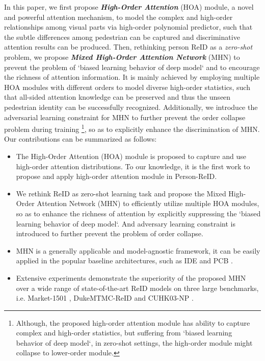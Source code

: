 \documentclass[10pt,twocolumn,letterpaper]{article}
\begin{document}
In this paper, we first propose \emph{\textbf{High-Order Attention}} (HOA) module, a novel and powerful attention mechanism, to model the complex and high-order relationships among visual parts via high-order polynomial predictor, such that the subtle differences among pedestrian can be captured and discriminative attention results can be produced. Then, rethinking person ReID as a \emph{zero-shot} problem, we propose \emph{\textbf{Mixed High-Order Attention Network}} (MHN) to prevent the problem of `biased learning behavior of deep model` \cite{chen2019energy} and to encourage the richness of attention information. It is mainly achieved by employing multiple HOA modules with different orders to model diverse high-order statistics, such that all-sided attention knowledge can be preserved and thus the unseen pedestrian identity can be successfully recognized. Additionally, we introduce the adversarial learning constraint for MHN to further prevent the order collapse problem during training \footnote{Although, the proposed high-order attention module has ability to capture complex and high-order statistics, but suffering from `biased learning behavior of deep model`, in zero-shot settings, the high-order module might collapse to lower-order module.}, so as to explicitly enhance the discrimination of MHN. Our contributions can be summarized as follows:
\begin{itemize}
\vspace{-0.5em}
  \item The High-Order Attention (HOA) module is proposed to capture and use high-order attention distributions. To our knowledge, it is the first work to propose and apply high-order attention module in Person-ReID.
      \vspace{-0.5em}
  \item We rethink ReID as zero-shot learning task and propose the Mixed High-Order Attention Network (MHN) to efficiently utilize multiple HOA modules, so as to enhance the richness of attention by explicitly suppressing the `biased learning behavior of deep model`. And adversary learning constraint is introduced to further prevent the problem of order collapse.
      \vspace{-0.5em}
  \item MHN is a generally applicable and model-agnostic framework, it can be easily applied in the popular baseline architectures, such as IDE \cite{zheng2016person} and PCB \cite{sun2018beyond}.
      \vspace{-0.5em}
  \item Extensive experiments demonstrate the superiority of the proposed MHN over a wide range of state-of-the-art ReID models on three large benchmarks, i.e. Market-1501 \cite{zheng2015scalable}, DukeMTMC-ReID \cite{ristani2016performance,zheng2017unlabeled} and CUHK03-NP \cite{li2014deepreid,zhong2017re}.
      \vspace{-0.5em}
\end{itemize}
\end{document}

